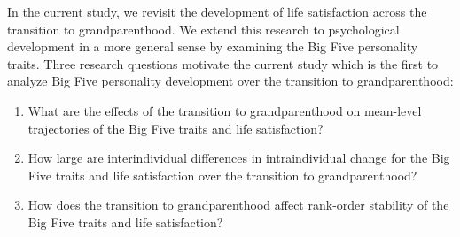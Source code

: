 \documentclass[
  english,
  man, noextraspace]{apa7}
\providecommand{\tightlist}{%
  \setlength{\itemsep}{0pt}\setlength{\parskip}{0pt}}
\begin{document}
In the current study, we revisit the development of life satisfaction across the transition to grandparenthood. We extend this research to psychological development in a more general sense by examining the Big Five personality traits. Three research questions motivate the current study which is the first to analyze Big Five personality development over the transition to grandparenthood:

\begin{enumerate}
\def\labelenumi{\arabic{enumi}.}
\tightlist
\item
  What are the effects of the transition to grandparenthood on mean-level trajectories of the Big Five traits and life satisfaction?
\item
  How large are interindividual differences in intraindividual change for the Big Five traits and life satisfaction over the transition to grandparenthood?
\item
  How does the transition to grandparenthood affect rank-order stability of the Big Five traits and life satisfaction?
\end{enumerate}
\end{document}
